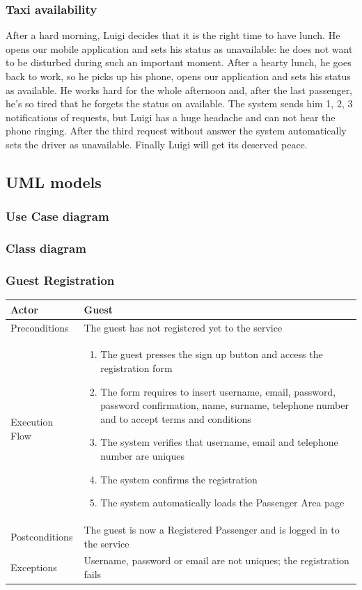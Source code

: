 		\subsubsection{Taxi availability}
			After a hard morning, Luigi decides that it is the right time to have lunch. He opens our mobile
			application and sets his status as unavailable: he does not want to be disturbed during such an
			important moment. After a hearty lunch, he goes back to work, so he picks up his phone, opens our
			application and sets his status as available. He works hard for the whole afternoon and, after the
			last passenger, he's so tired that he forgets the status on available. The system sends him 1, 2, 3
			notifications of requests, but Luigi has a huge headache and can not hear the phone ringing. After
			the third request without answer the system automatically sets the driver as unavailable.
			Finally Luigi will get its deserved peace.
	\subsection{UML models}
		\subsubsection{Use Case diagram}
		\subsubsection{Class diagram}
		\subsubsection{Guest Registration}
			\begin{center}
				\begin{tabular}{ | l | p{8cm} |}
					\hline
					Actor &  Guest	\\ \hline
					Preconditions & The guest has not registered yet to the service		\\ \hline
					Execution Flow & \begin{enumerate}
						\item The guest presses the sign up button and access the registration form
						\item The form requires to insert username, email, password, password confirmation, name, surname, telephone number and to accept terms and conditions
						\item The system verifies that username, email and telephone number are uniques
						\item The system confirms the registration
						\item The system automatically loads the Passenger Area page
					\end{enumerate}		\\ \hline
					Postconditions & The guest is now a Registered Passenger and is logged in to the service	\\ \hline
					Exceptions & Username, password or email are not uniques; the registration fails \\ \hline
				\end{tabular}
			\end{center}
